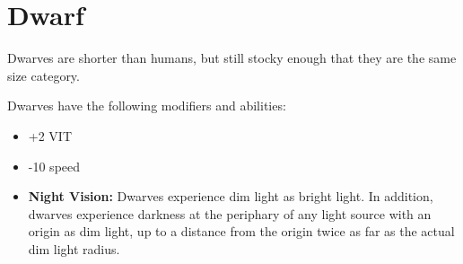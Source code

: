 \section{Dwarf}\label{dwarf}
Dwarves are shorter than humans, but still stocky enough that they are the same
size category.

Dwarves have the following modifiers and abilities:
\begin{itemize}
    \item +2 VIT
    \item -10 speed
    \item \textbf{Night Vision:} Dwarves experience dim light as bright light.
        In addition, dwarves experience darkness at the periphary of any
        light source with an origin as dim light, up to a distance from the
        origin twice as far as the actual dim light radius.
\end{itemize}
